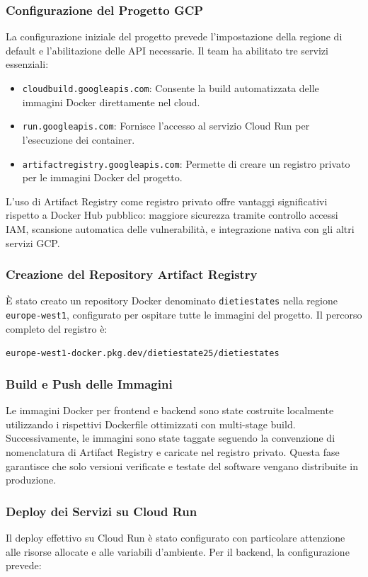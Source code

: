 \subsubsection{Configurazione del Progetto GCP}
La configurazione iniziale del progetto prevede l'impostazione della regione di default e l'abilitazione delle API necessarie. Il team ha abilitato tre servizi essenziali:
\begin{itemize}
    \item \texttt{cloudbuild.googleapis.com}: Consente la build automatizzata delle immagini Docker direttamente nel cloud.
    \item \texttt{run.googleapis.com}: Fornisce l'accesso al servizio Cloud Run per l'esecuzione dei container.
    \item \texttt{artifactregistry.googleapis.com}: Permette di creare un registro privato per le immagini Docker del progetto.
\end{itemize}

L'uso di Artifact Registry come registro privato offre vantaggi significativi rispetto a Docker Hub pubblico: maggiore sicurezza tramite controllo accessi IAM, scansione automatica delle vulnerabilità, e integrazione nativa con gli altri servizi GCP.

\subsubsection{Creazione del Repository Artifact Registry}
È stato creato un repository Docker denominato \texttt{dietiestates} nella regione \texttt{europe-west1}, configurato per ospitare tutte le immagini del progetto. Il percorso completo del registro è:
\begin{center}
    \texttt{europe-west1-docker.pkg.dev/dietiestate25/dietiestates}
\end{center}

\subsubsection{Build e Push delle Immagini}
Le immagini Docker per frontend e backend sono state costruite localmente utilizzando i rispettivi Dockerfile ottimizzati con multi-stage build. Successivamente, le immagini sono state taggate seguendo la convenzione di nomenclatura di Artifact Registry e caricate nel registro privato. Questa fase garantisce che solo versioni verificate e testate del software vengano distribuite in produzione.

\subsubsection{Deploy dei Servizi su Cloud Run}
Il deploy effettivo su Cloud Run è stato configurato con particolare attenzione alle risorse allocate e alle variabili d'ambiente. Per il backend, la configurazione prevede:

